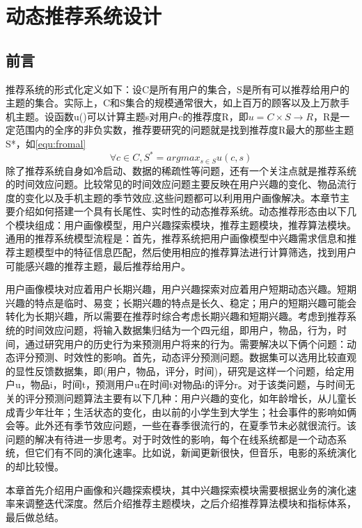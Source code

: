 
\chapter{动态推荐系统设计}
  \section{前言}
  推荐系统的形式化定义如下：设C是所有用户的集合，S是所有可以推荐给用户的主题的集合。实际上，C和S集合的规模通常很大，如上百万的顾客以及上万款手机主题。设函数u()可以计算主题s对用户c的推荐度R，即$u=C\times S \rightarrow R$，R是一定范围内的全序的非负实数，推荐要研究的问题就是找到推荐度R最大的那些主题S*，如\autoref{equ:fromal}
    \begin{equation}
    \forall c \in C,S^{*}=arg  max_{s \in S} u(c,s)
    \label{equ:fromal}
    \end{equation}
  除了推荐系统自身如冷启动、数据的稀疏性等问题，还有一个关注点就是推荐系统的时间效应问题。比较常见的时间效应问题主要反映在用户兴趣的变化、物品流行度的变化以及手机主题的季节效应,这些问题都可以利用用户画像解决。本章节主要介绍如何搭建一个具有长尾性、实时性的动态推荐系统。动态推荐形态由以下几个模块组成：用户画像模型，用户兴趣探索模块，推荐主题模块，推荐算法模块。通用的推荐系统模型流程是：首先，推荐系统把用户画像模型中兴趣需求信息和推荐主题模型中的特征信息匹配，然后使用相应的推荐算法进行计算筛选，找到用户可能感兴趣的推荐主题，最后推荐给用户。

  用户画像模块对应着用户长期兴趣，用户兴趣探索对应着用户短期动态兴趣。短期兴趣的特点是临时、易变；长期兴趣的特点是长久、稳定；用户的短期兴趣可能会转化为长期兴趣，所以需要在推荐时综合考虑长期兴趣和短期兴趣。考虑到推荐系统的时间效应问题，将输入数据集归结为一个四元组，即{用户，物品，行为，时间}，通过研究用户的历史行为来预测用户将来的行为。需要解决以下俩个问题：动态评分预测、时效性的影响。首先，动态评分预测问题。数据集可以选用比较直观的显性反馈数据集，即(用户，物品，评分，时间)，研究是这样一个问题，给定用户u，物品i，时间t，预测用户u在时间t对物品i的评分r。对于该类问题，与时间无关的评分预测问题算法主要有以下几种：用户兴趣的变化，如年龄增长，从儿童长成青少年壮年；生活状态的变化，由以前的小学生到大学生；社会事件的影响如俩会等。此外还有季节效应问题，一些在春季很流行的，在夏季节未必就很流行。该问题的解决有待进一步思考。对于时效性的影响，每个在线系统都是一个动态系统，但它们有不同的演化速率。比如说，新闻更新很快，但音乐，电影的系统演化的却比较慢。

  本章首先介绍用户画像和兴趣探索模块，其中兴趣探索模块需要根据业务的演化速率来调整迭代深度。然后介绍推荐主题模块，之后介绍推荐算法模块和指标体系，最后做总结。
  
